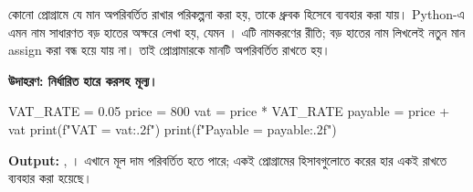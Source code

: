 
কোনো প্রোগ্রামে যে মান অপরিবর্তিত রাখার পরিকল্পনা করা হয়, তাকে ধ্রুবক
হিসেবে ব্যবহার করা যায়। Python-এ এমন নাম সাধারণত বড় হাতের অক্ষরে লেখা হয়,
যেমন । এটি নামকরণের রীতি; বড় হাতের নাম লিখলেই নতুন মান
assign করা বন্ধ হয়ে যায় না। তাই প্রোগ্রামারকে মানটি অপরিবর্তিত রাখতে হয়।

\textbf{উদাহরণ: নির্ধারিত হারে করসহ মূল্য।}
\begin{pythoncode}
VAT_RATE = 0.05
price = 800
vat = price * VAT_RATE
payable = price + vat
print(f"VAT = {vat:.2f}")
print(f"Payable = {payable:.2f}")
\end{pythoncode}
\textbf{Output:} , ।
এখানে মূল দাম পরিবর্তিত হতে পারে; একই প্রোগ্রামের হিসাবগুলোতে করের হার
একই রাখতে  ব্যবহার করা হয়েছে।

